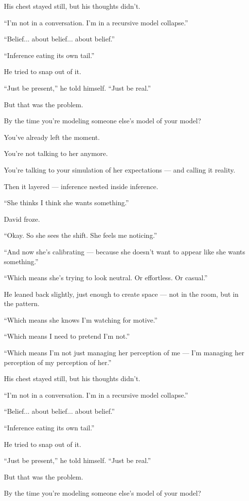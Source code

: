 His chest stayed still, but his thoughts didn’t.

“I’m not in a conversation. I’m in a recursive model collapse.”

“Belief... about belief... about belief.”

“Inference eating its own tail.”

He tried to snap out of it.

“Just be present,” he told himself. “Just be real.”

But that was the problem.

By the time you’re modeling someone else’s model of your model?

You’ve already left the moment.

You’re not talking to her anymore.

You’re talking to your simulation of her expectations — and calling it reality.

Then it layered — inference nested inside inference.

“She thinks I think she wants something.”

David froze.

“Okay. So she sees the shift. She feels me noticing.”

“And now she’s calibrating — because she doesn’t want to appear like she wants something.”

“Which means she’s trying to look neutral. Or effortless. Or casual.”

He leaned back slightly, just enough to create space — not in the room, but in the pattern.

“Which means she knows I’m watching for motive.”

“Which means I need to pretend I’m not.”

“Which means I’m not just managing her perception of me — I’m managing her perception of my perception of her.”

His chest stayed still, but his thoughts didn’t.

“I’m not in a conversation. I’m in a recursive model collapse.”

“Belief... about belief... about belief.”

“Inference eating its own tail.”

He tried to snap out of it.

“Just be present,” he told himself. “Just be real.”

But that was the problem.

By the time you’re modeling someone else’s model of your model?

